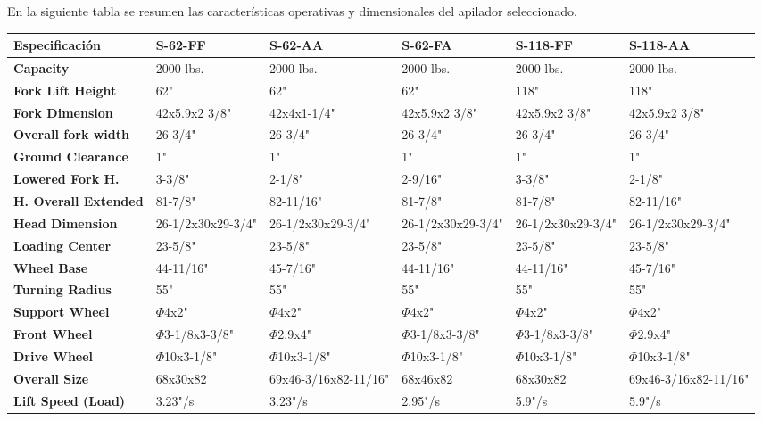 \documentclass[11pt, a4paper]{article}
\begin{document}
En la siguiente tabla se resumen las características operativas y dimensionales del apilador seleccionado.

\vspace{0.5cm}
\begin{table}[h!]
    \centering
    \renewcommand{\arraystretch}{1.3}
    \small
    \begin{tabularx}{\textwidth}{>{\raggedright\arraybackslash\bfseries}p{4cm} X X X X X}
        \toprule
        Especificación & S-62-FF & S-62-AA & S-62-FA & S-118-FF & S-118-AA \\
        \midrule
        Capacity & 2000 lbs. & 2000 lbs. & 2000 lbs. & 2000 lbs. & 2000 lbs. \\
        Fork Lift Height & 62" & 62" & 62" & 118" & 118" \\
        Fork Dimension & 42x5.9x2 3/8" & 42x4x1-1/4" & 42x5.9x2 3/8" & 42x5.9x2 3/8" & 42x5.9x2 3/8" \\
        Overall fork width & 26-3/4" & 26-3/4" & 26-3/4" & 26-3/4" & 26-3/4" \\
        Ground Clearance & 1" & 1" & 1" & 1" & 1" \\
        Lowered Fork H. & 3-3/8" & 2-1/8" & 2-9/16" & 3-3/8" & 2-1/8" \\
        H. Overall Extended & 81-7/8" & 82-11/16" & 81-7/8" & 81-7/8" & 82-11/16" \\
        Head Dimension & 26-1/2x30x29-3/4" & 26-1/2x30x29-3/4" & 26-1/2x30x29-3/4" & 26-1/2x30x29-3/4" & 26-1/2x30x29-3/4" \\
        Loading Center & 23-5/8" & 23-5/8" & 23-5/8" & 23-5/8" & 23-5/8" \\
        Wheel Base & 44-11/16" & 45-7/16" & 44-11/16" & 44-11/16" & 45-7/16" \\
        Turning Radius & 55" & 55" & 55" & 55" & 55" \\
        Support Wheel & $\Phi$4x2" & $\Phi$4x2" & $\Phi$4x2" & $\Phi$4x2" & $\Phi$4x2" \\
        Front Wheel & $\Phi$3-1/8x3-3/8" & $\Phi$2.9x4" & $\Phi$3-1/8x3-3/8" & $\Phi$3-1/8x3-3/8" & $\Phi$2.9x4" \\
        Drive Wheel & $\Phi$10x3-1/8" & $\Phi$10x3-1/8" & $\Phi$10x3-1/8" & $\Phi$10x3-1/8" & $\Phi$10x3-1/8" \\
        Overall Size & 68x30x82 & 69x46-3/16x82-11/16" & 68x46x82 & 68x30x82 & 69x46-3/16x82-11/16" \\
        Lift Speed (Load) & 3.23"/s & 3.23"/s & 2.95"/s & 5.9"/s & 5.9"/s \\

\end{tabularx}
\end{table}
\end{document}
